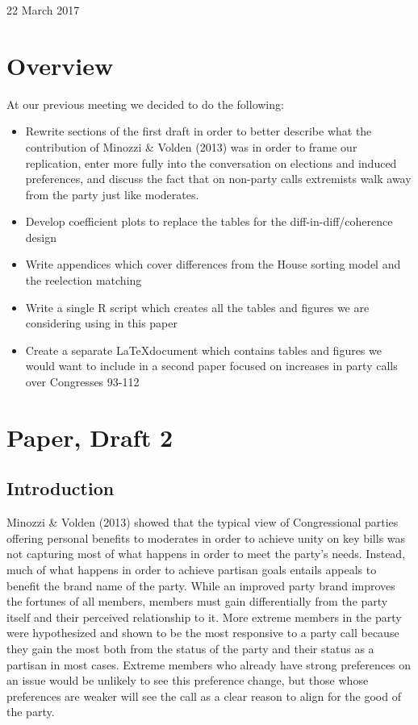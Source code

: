 \documentclass[12pt]{article}
\begin{document}
	
\begin{center}
	\Large 22 March 2017
\end{center}

\section{Overview}

At our previous meeting we decided to do the following:
\begin{itemize}
	\item Rewrite sections of the first draft in order to better describe what the contribution of Minozzi \& Volden (2013) was in order to frame our replication, enter more fully into the conversation on elections and induced preferences, and discuss the fact that on non-party calls extremists walk away from the party just like moderates.
	
	\item Develop coefficient plots to replace the tables for the diff-in-diff/coherence design
	
	\item Write appendices which cover differences from the House sorting model and the reelection matching
	
	\item Write a single R script which creates all the tables and figures we are considering using in this paper
	
	\item Create a separate \LaTeX document which contains tables and figures we would want to include in a second paper focused on increases in party calls over Congresses 93-112
\end{itemize}

\section{Paper, Draft 2}

\subsection{Introduction}

Minozzi \& Volden (2013) showed that the typical view of Congressional parties offering personal benefits to moderates in order to achieve unity on key bills was not capturing most of what happens in order to meet the party's needs. Instead, much of what happens in order to achieve partisan goals entails appeals to benefit the brand name of the party. While an improved party brand improves the fortunes of all members, members must gain differentially from the party itself and their perceived relationship to it. More extreme members in the party were hypothesized and shown to be the most responsive to a party call because they gain the most both from the status of the party and their status as a partisan in most cases. Extreme members who already have strong preferences on an issue would be unlikely to see this preference change, but those whose preferences are weaker will see the call as a clear reason to align for the good of the party.
\end{document}
